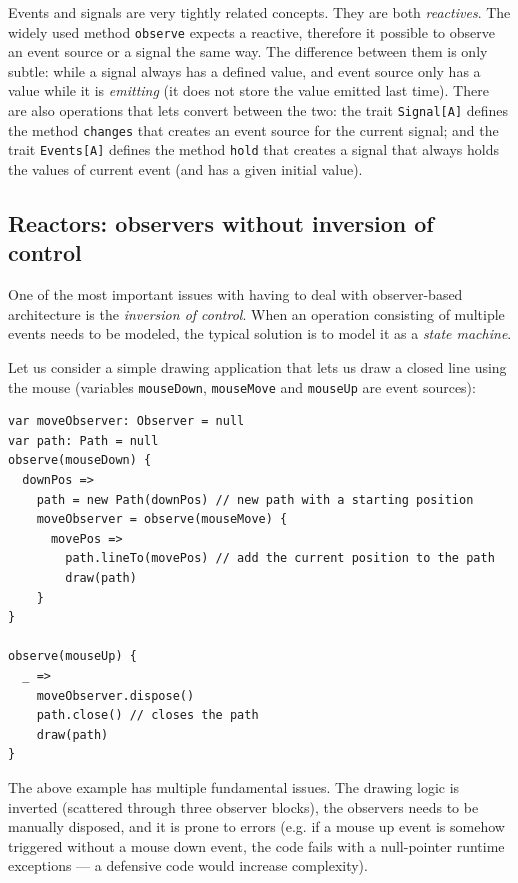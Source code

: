 Events and signals are very tightly related concepts. They are both \emph{reactives}. The widely used method \texttt{observe} expects a reactive, therefore it possible to observe an event source or a signal the same way. The difference between them is only subtle: while a signal always has a defined value, and event source only has a value while it is \emph{emitting} (it does not store the value emitted last time). There are also operations that lets convert between the two: the trait \texttt{Signal[A]} defines the method \texttt{changes} that creates an event source for the current signal; and the trait \texttt{Events[A]} defines the method \texttt{hold} that creates a signal that always holds the values of current event (and has a given initial value).

\subsection{Reactors: observers without inversion of control}

One of the most important issues with having to deal with observer-based architecture is the \emph{inversion of control}. When an operation consisting of multiple events needs to be modeled, the typical solution is to model it as a \emph{state machine}. 

Let us consider a simple drawing application that lets us draw a closed line using the mouse (variables \texttt{mouseDown}, \texttt{mouseMove} and \texttt{mouseUp} are event sources):

\begin{lstlisting}
var moveObserver: Observer = null
var path: Path = null
observe(mouseDown) {
  downPos => 
    path = new Path(downPos) // new path with a starting position
    moveObserver = observe(mouseMove) {
      movePos =>
        path.lineTo(movePos) // add the current position to the path
        draw(path)
    }
}

observe(mouseUp) {
  _ =>
    moveObserver.dispose()
    path.close() // closes the path
    draw(path)
}
\end{lstlisting}

The above example has multiple fundamental issues. The drawing logic is inverted (scattered through three observer blocks), the observers needs to be manually disposed, and it is prone to errors (e.g. if a mouse up event is somehow triggered without a mouse down event, the code fails with a null-pointer runtime exceptions --- a defensive code would increase complexity).

